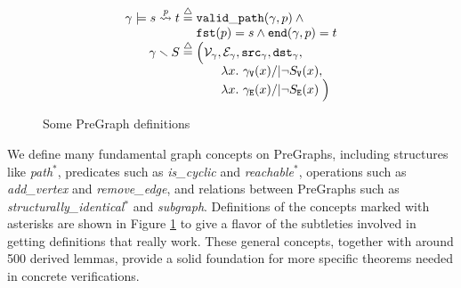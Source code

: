 \documentclass[acmsmall,screen]{acmart}
\newcommand{\defeq}{\mathbin{\stackrel{\triangle}{=}}}
\begin{document}
\begin{figure}
\begin{minipage}{.5\textwidth}
\begin{equation*}
{\begin{array}{r@{}c@{}l}
      \gamma |= s \overset{\m{p}}{\leadsto} t \;&\defeq\;&
        \mathtt{valid\_path}(\gamma, p)\wedge \null \\
        &&\mathtt{fst}(p)=s \wedge \mathtt{end}(\gamma,p)=t \\
      \gamma \smallsetminus S \; &\defeq \;&
          \Big(\mathcal{V}_{\gamma},\mathcal{E}_{\gamma}, \mathtt{src}_{\gamma}, \mathtt{dst}_{\gamma}, \\
          &&\qquad \lambda x.~ \gamma_{\mathtt{V}}(x) /| \lnot S_{\mathtt{V}}(x), \\
          &&\qquad \lambda x.~ \gamma_{\mathtt{E}}(x) /| \lnot S_{\mathtt{E}}(x)\;\Big)
  \end{array}}
  \end{equation*}
  \end{minipage}
\vspace{-.7em}
\caption{Some PreGraph definitions}
\label{fig:pregraphdefs}
\vspace{-1em}
\end{figure}

%
 
We define many fundamental graph concepts on PreGraphs,
including structures like \emph{path}$^{*}$, predicates
such as \emph{is\_cyclic} and \emph{reachable}$^{*}$,
operations such as \emph{add\_vertex}
and \emph{remove\_edge}, and relations between PreGraphs such
as \emph{structurally\_identical}$^{*}$ and \emph{subgraph}.
Definitions of the concepts marked with asterisks are
shown in Figure \ref{fig:pregraphdefs} to give a flavor
of the subtleties involved in getting definitions that
really work.
These general concepts, together with around 500 derived lemmas,
provide a
solid foundation for more specific theorems needed in concrete
verifications.
\end{document}
